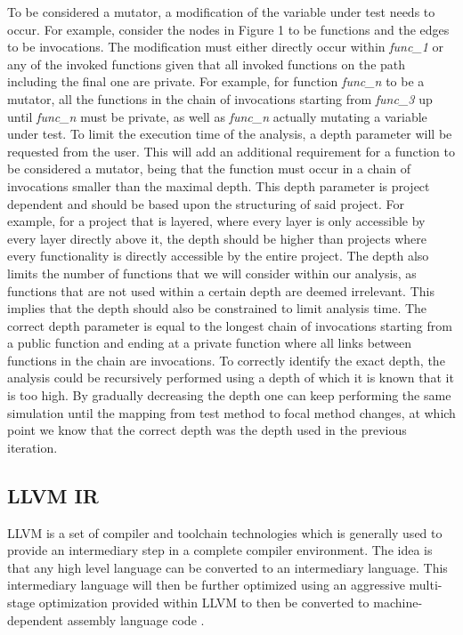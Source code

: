 \documentclass[11pt]{article}
\begin{document}
\begin{multicols}{2}
\smallskip
To be considered a mutator, a modification of the variable under test needs to occur.
For example, consider the nodes in Figure 1 to be functions and the edges to be invocations. The modification must either directly occur within \textit{func\_1} or any of the invoked functions given that all invoked functions on the path including the final one are private. For example, for function \textit{func\_n} to be a mutator, all the functions in the chain of invocations starting from \textit{func\_3} up until \textit{func\_n} must be private, as well as \textit{func\_n} actually mutating a variable under test. To limit the execution time of the analysis, a depth parameter will be requested from the user. This will add an additional requirement for a function to be considered a mutator, being that the function must occur in a chain of invocations smaller than the maximal depth. This depth parameter is project dependent and should be based upon the structuring of said project. For example, for a project that is layered, where every layer is only accessible by every layer directly above it, the depth should be higher than projects where every functionality is directly accessible by the entire project. The depth also limits the number of functions that we will consider within our analysis, as functions that are not used within a certain depth are deemed irrelevant. This implies that the depth should also be constrained to limit analysis time. The correct depth parameter is equal to the longest chain of invocations starting from a public function and ending at a private function where all links between functions in the chain are invocations. To correctly identify the exact depth, the analysis could be recursively performed using a depth of which it is known that it is too high. By gradually decreasing the depth one can keep performing the same simulation until the mapping from test method to focal method changes, at which point we know that the correct depth was the depth used in the previous iteration.

\subsection{LLVM IR}
LLVM  is a set of compiler and toolchain technologies which is generally used to provide an intermediary step in a complete compiler environment. The idea is that any high level language can be converted to an intermediary language. This intermediary language will then be further optimized using an aggressive multi-stage optimization provided within LLVM to then be converted to machine-dependent assembly language code \cite{lattner2002llvm}.


\end{multicols}
\end{document}
